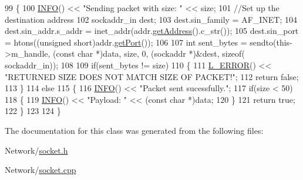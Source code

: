 \begin{DoxyCode}
99 \{
100     \hyperlink{Log_8h_a7cec51f4ce4b22e8c0f256485d57fca7}{INFO}() << \textcolor{stringliteral}{"Sending packet with size: "} << size;
101     \textcolor{comment}{//Set up the destination address}
102     sockaddr\_in dest;
103     dest.sin\_family = AF\_INET;
104     dest.sin\_addr.s\_addr = inet\_addr(addr.\hyperlink{classAddress_aa84d076d4adf5cac8381146fcf261af7}{getAddress}().c\_str());
105     dest.sin\_port = htons((\textcolor{keywordtype}{unsigned} \textcolor{keywordtype}{short})addr.\hyperlink{classAddress_aa7d7e4b33ab75aa3ca146341a5e74472}{getPort}());
106 
107     \textcolor{keywordtype}{int} sent\_bytes = sendto(this->m\_handle, (\textcolor{keyword}{const} \textcolor{keywordtype}{char} *)data, size, 0, (sockaddr *)&dest, \textcolor{keyword}{sizeof}(
      sockaddr\_in));
108 
109     \textcolor{keywordflow}{if}(sent\_bytes != size)
110     \{
111         \hyperlink{Log_8h_a1a242c34c5066fb0c62d909f22d3716d}{L\_ERROR}() << \textcolor{stringliteral}{"RETURNED SIZE DOES NOT MATCH SIZE OF PACKET!"};
112         \textcolor{keywordflow}{return} \textcolor{keyword}{false};
113     \}
114     \textcolor{keywordflow}{else}
115     \{
116         \hyperlink{Log_8h_a7cec51f4ce4b22e8c0f256485d57fca7}{INFO}() << \textcolor{stringliteral}{"Packet sent sucessfully."};
117         \textcolor{keywordflow}{if}(size < 50)
118         \{
119             \hyperlink{Log_8h_a7cec51f4ce4b22e8c0f256485d57fca7}{INFO}() << \textcolor{stringliteral}{"Payload: "} << (\textcolor{keyword}{const} \textcolor{keywordtype}{char} *)data;
120         \}
121         \textcolor{keywordflow}{return} \textcolor{keyword}{true};
122     \}
123 
124 \}
\end{DoxyCode}


The documentation for this class was generated from the following files\-:\begin{DoxyCompactItemize}
\item 
Network/\hyperlink{socket_8h}{socket.\-h}\item 
Network/\hyperlink{socket_8cpp}{socket.\-cpp}\end{DoxyCompactItemize}
